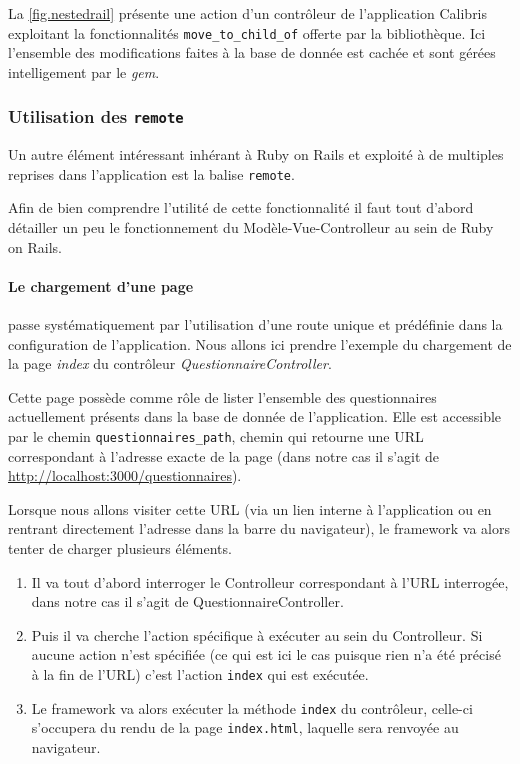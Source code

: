 \documentclass[12pt,a4paper]{book}
\begin{document}
La \cref{fig.nestedrail} présente une action d'un contrôleur de l'application Calibris exploitant la fonctionnalités \texttt{move\_to\_child\_of} offerte par la bibliothèque. Ici l'ensemble des modifications faites à la base de donnée est cachée et sont gérées intelligement par le \textit{gem}.

\subsubsection{Utilisation des \texttt{remote}}

Un autre élément intéressant inhérant à Ruby on Rails et exploité à de multiples reprises dans l'application est la balise \texttt{remote}.

Afin de bien comprendre l'utilité de cette fonctionnalité il faut tout d'abord détailler un peu le fonctionnement du Modèle-Vue-Controlleur au sein de Ruby on Rails.

\paragraph{Le chargement d'une page} passe systématiquement par l'utilisation d'une route unique et prédéfinie dans la configuration de l'application. Nous allons ici prendre l'exemple du chargement de la page \textit{index} du contrôleur \textit{QuestionnaireController}.

Cette page possède comme rôle de lister l'ensemble des questionnaires actuellement présents dans la base de donnée de l'application. Elle est accessible par le chemin \texttt{questionnaires\_path}, chemin qui retourne une URL correspondant à l'adresse exacte de la page (dans notre cas il s'agit de \url{http://localhost:3000/questionnaires}).

Lorsque nous allons visiter cette URL (via un lien interne à l'application ou en rentrant directement l'adresse dans la barre du navigateur), le framework va alors tenter de charger plusieurs éléments.

\begin{enumerate}
  \item Il va tout d'abord interroger le Controlleur correspondant à l'URL interrogée, dans notre cas il s'agit de QuestionnaireController.
  \item Puis il va cherche l'action spécifique à exécuter au sein du Controlleur. Si aucune action n'est spécifiée (ce qui est ici le cas puisque rien n'a été précisé à la fin de l'URL) c'est l'action \texttt{index} qui est exécutée.
  \item Le framework va alors exécuter la méthode \texttt{index} du contrôleur, celle-ci s'occupera du rendu de la page \texttt{index.html}, laquelle sera renvoyée au navigateur.
\end{enumerate}
\end{document}
